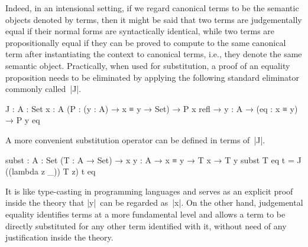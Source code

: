Indeed, in an intensional setting, if we regard canonical terms to be the semantic objects denoted by terms, then it might be said that two terms are judgementally equal if their normal forms are syntactically identical, while two terms are propositionally equal if they can be proved to compute to the same canonical term after instantiating the context to canonical terms, i.e., they denote the same semantic object.
Practically, when used for substitution, a proof of an equality proposition needs to be eliminated by applying the following standard eliminator commonly called~|J|.
\begin{code}
J :  {A : Set} {x : A} (P : (y : A) → x ≡ y → Set) →
     P x refl → {y : A} → (eq : x ≡ y) → P y eq
\end{code}
A more convenient substitution operator can be defined in terms of~|J|.
\begin{code}
subst : {A : Set} (T : A → Set) → {x y : A} → x ≡ y → T x → T y
subst T eq t = J ((lambda z _)) T z) t eq
\end{code}
It is like type-casting in programming languages and serves as an explicit proof inside the theory that |y|~can be regarded as~|x|.
On the other hand, judgemental equality identifies terms at a more fundamental level and allows a term to be directly substituted for any other term identified with it, without need of any justification inside the theory.

